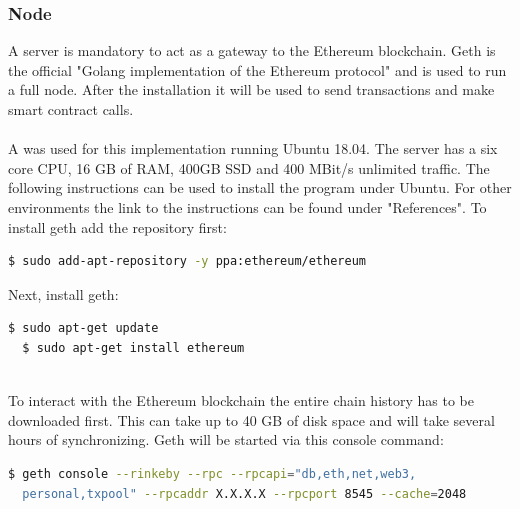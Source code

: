 \subsubsection{Node}
A server is mandatory to act as a gateway to the Ethereum blockchain.
Geth is the official "Golang implementation of the Ethereum protocol"\cite{geth} and is used to run a full node.
After the installation it will be used to send transactions and make smart contract calls.
\\\\
A  was used for this implementation running Ubuntu 18.04. The server has a six core CPU, 16 GB of RAM, 400GB SSD and 400 MBit/s unlimited traffic.
The following instructions can be used to install the program under Ubuntu.
For other environments the link to the instructions can be found under "References"\cite{geth-instructions}.
To install geth add the repository first:
\begin{lstlisting}[language=bash, numbers=none]
  $ sudo add-apt-repository -y ppa:ethereum/ethereum
\end{lstlisting}

Next, install geth:
\begin{lstlisting}[language=bash, numbers=none]
  $ sudo apt-get update
  $ sudo apt-get install ethereum
\end{lstlisting}
\leavevmode
\\
To interact with the Ethereum blockchain the entire chain history has to be downloaded first.
This can take up to 40 GB of disk space and will take several hours of synchronizing.
Geth will be started via this console command:
\begin{lstlisting}[language=bash, showstringspaces=false, numbers=none]
  $ geth console --rinkeby --rpc --rpcapi="db,eth,net,web3,
  personal,txpool" --rpcaddr X.X.X.X --rpcport 8545 --cache=2048
\end{lstlisting}

